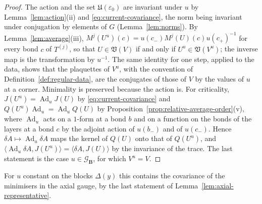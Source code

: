 \documentclass[11pt]{preprint}
\newcommand{\Ad}{\operatorname{Ad}}
\numberwithin{equation}{section}
\begin{document}
\begin{proof}
The action and the set $\mathfrak U(\varepsilon_0)$ are invariant under $u$ by Lemma~\ref{lem:action}(ii) and \eqref{eq:current-covariance}, the norm being invariant under conjugation by elements of $G$ (Lemma~\ref{lem:norms}). By Lemma~\ref{lem:average}(iii), $M^j(U^u)(c) = u(c_-)M^j(U)(c)u(c_+)^{-1}$ for every bond $c$ of $T^{(j)}$, so that $U \in \mathfrak V(V)$ if and only if $U^u \in \mathfrak V(V^u)$; the inverse map is the transformation by $u^{-1}$. The same identity for one step, applied to the data, shows that the plaquettes of $V^u$, with the convention of Definition~\ref{def:regular-data}, are the conjugates of those of $V$ by the values of $u$ at a corner. Minimality is preserved because the action is. For criticality, $J(U^u) = \Ad_uJ(U)$ by \eqref{eq:current-covariance} and $Q(U^u)\Ad_u = \Ad_uQ(U)$ by Proposition~\ref{prop:relative-average-order}(v), where $\Ad_u$ acts on a $1$-form at a bond $b$ and on a function on the bonds of the layers at a bond $c$ by the adjoint action of $u(b_-)$ and of $u(c_-)$. Hence $\delta A \mapsto \Ad_u\delta A$ maps the kernel of $Q(U)$ onto that of $Q(U^u)$, and $\langle \Ad_u\delta A, J(U^u)\rangle = \langle\delta A, J(U)\rangle$ by the invariance of the trace. The last statement is the case $u \in \mathcal G_{\mathbf B}$, for which $V^u = V$.
\end{proof}

For $u$ constant on the blocks $\Delta(y)$ this contains the covariance \cite[(181), p.~307]{BalabanVAR} of the minimisers in the axial gauge, by the last statement of Lemma~\ref{lem:axial-representative}.
\end{document}
